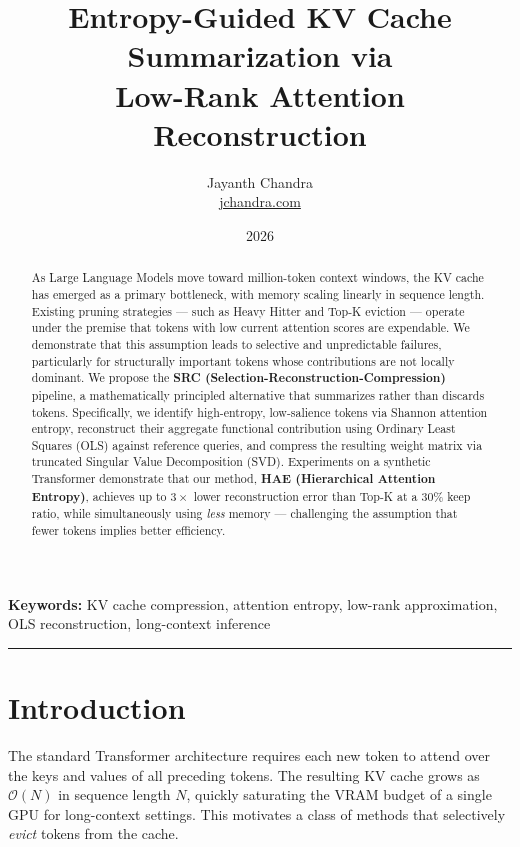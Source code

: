 \documentclass[11pt,a4paper]{article}
\title{
    \vspace{-1cm}
    \LARGE \textbf{Entropy-Guided KV Cache Summarization via} \\[4pt]
    \LARGE \textbf{Low-Rank Attention Reconstruction}
    \vspace{0.3cm}
}
\author{
    Jayanth Chandra \\
    \small \href{https://jchandra.com}{jchandra.com}
}
\date{2026}
\begin{document}
\maketitle
\thispagestyle{empty}

\begin{abstract}
As Large Language Models move toward million-token context windows, the KV cache has emerged as a primary bottleneck, with memory scaling linearly in sequence length. Existing pruning strategies --- such as Heavy Hitter and Top-K eviction --- operate under the premise that tokens with low current attention scores are expendable. We demonstrate that this assumption leads to selective and unpredictable failures, particularly for structurally important tokens whose contributions are not locally dominant. We propose the \textbf{SRC (Selection-Reconstruction-Compression)} pipeline, a mathematically principled alternative that summarizes rather than discards tokens. Specifically, we identify high-entropy, low-salience tokens via Shannon attention entropy, reconstruct their aggregate functional contribution using Ordinary Least Squares (OLS) against reference queries, and compress the resulting weight matrix via truncated Singular Value Decomposition (SVD). Experiments on a synthetic Transformer demonstrate that our method, \textbf{HAE (Hierarchical Attention Entropy)}, achieves up to $3\times$ lower reconstruction error than Top-K at a 30\% keep ratio, while simultaneously using \emph{less} memory --- challenging the assumption that fewer tokens implies better efficiency.
\end{abstract}

\vspace{0.5em}
\noindent\textbf{Keywords:} KV cache compression, attention entropy, low-rank approximation, OLS reconstruction, long-context inference

\hrule
\vspace{1em}

\section{Introduction}

The standard Transformer architecture requires each new token to attend over the keys and values of all preceding tokens. The resulting KV cache grows as $\mathcal{O}(N)$ in sequence length $N$, quickly saturating the VRAM budget of a single GPU for long-context settings. This motivates a class of methods that selectively \emph{evict} tokens from the cache.
\end{document}
